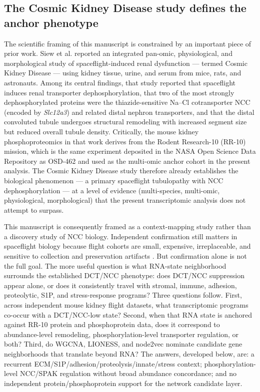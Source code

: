 \documentclass[11pt]{article}
\newcommand{\gene}[1]{\textit{#1}}
\begin{document}
\subsection{The Cosmic Kidney Disease study defines the anchor phenotype}

The scientific framing of this manuscript is constrained by an important piece of prior work. Siew et al. \citep{siew2024cosmic} reported an integrated pan-omic, physiological, and morphological study of spaceflight-induced renal dysfunction --- termed Cosmic Kidney Disease --- using kidney tissue, urine, and serum from mice, rats, and astronauts. Among its central findings, that study reported that spaceflight induces renal transporter dephosphorylation, that two of the most strongly dephosphorylated proteins were the thiazide-sensitive Na--Cl cotransporter NCC (encoded by \gene{Slc12a3}) and related distal nephron transporters, and that the distal convoluted tubule undergoes structural remodeling with increased segment size but reduced overall tubule density. Critically, the mouse kidney phosphoproteomics in that work derives from the Rodent Research-10 (RR-10) mission, which is the same experiment deposited in the NASA Open Science Data Repository as OSD-462 and used as the multi-omic anchor cohort in the present analysis. The Cosmic Kidney Disease study therefore already establishes the biological phenomenon --- a primary spaceflight tubulopathy with NCC dephosphorylation --- at a level of evidence (multi-species, multi-omic, physiological, morphological) that the present transcriptomic analysis does not attempt to surpass.

This manuscript is consequently framed as a context-mapping study rather than a discovery study of NCC biology. Independent confirmation still matters in spaceflight biology because flight cohorts are small, expensive, irreplaceable, and sensitive to collection and preservation artifacts \citep{galazka2020rnaseq,preserve2016}. But confirmation alone is not the full goal. The more useful question is what RNA-state neighborhood surrounds the established DCT/NCC phenotype: does DCT/NCC suppression appear alone, or does it consistently travel with stromal, immune, adhesion, proteolytic, S1P, and stress-response programs? Three questions follow. First, across independent mouse kidney flight datasets, what transcriptomic programs co-occur with a DCT/NCC-low state? Second, when that RNA state is anchored against RR-10 protein and phosphoprotein data, does it correspond to abundance-level remodeling, phosphorylation-level transporter regulation, or both? Third, do WGCNA, LIONESS, and node2vec nominate candidate gene neighborhoods that translate beyond RNA? The answers, developed below, are: a recurrent ECM/S1P/adhesion/proteolysis/innate/stress context; phosphorylation-level NCC/SPAK regulation without broad abundance concordance; and no independent protein/phosphoprotein support for the network candidate layer.
\end{document}
